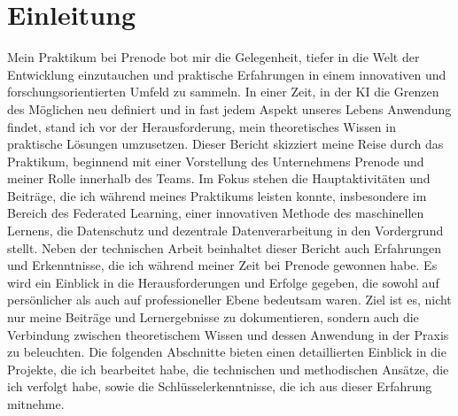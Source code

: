 \documentclass[11pt]{article}
\begin{document}
\section{Einleitung}
Mein Praktikum bei Prenode bot mir die Gelegenheit, tiefer in die Welt der Entwicklung einzutauchen und praktische Erfahrungen in einem innovativen und forschungsorientierten Umfeld zu sammeln. In einer Zeit, in der KI die Grenzen des Möglichen neu definiert und in fast jedem Aspekt unseres Lebens Anwendung findet, stand ich vor der Herausforderung, mein theoretisches Wissen in praktische Lösungen umzusetzen. Dieser Bericht skizziert meine Reise durch das Praktikum, beginnend mit einer Vorstellung des Unternehmens Prenode und meiner Rolle innerhalb des Teams. Im Fokus stehen die Hauptaktivitäten und Beiträge, die ich während meines Praktikums leisten konnte, insbesondere im Bereich des Federated Learning, einer innovativen Methode des maschinellen Lernens, die Datenschutz und dezentrale Datenverarbeitung in den Vordergrund stellt.
\newline
Neben der technischen Arbeit beinhaltet dieser Bericht auch Erfahrungen und Erkenntnisse, die ich während meiner Zeit bei Prenode gewonnen habe. Es wird ein Einblick in die Herausforderungen und Erfolge gegeben, die sowohl auf persönlicher als auch auf professioneller Ebene bedeutsam waren. Ziel ist es, nicht nur meine Beiträge und Lernergebnisse zu dokumentieren, sondern auch die Verbindung zwischen theoretischem Wissen und dessen Anwendung in der Praxis zu beleuchten.
\newline
Die folgenden Abschnitte bieten einen detaillierten Einblick in die Projekte, die ich bearbeitet habe, die technischen und methodischen Ansätze, die ich verfolgt habe, sowie die Schlüsselerkenntnisse, die ich aus dieser Erfahrung mitnehme.
\end{document}
